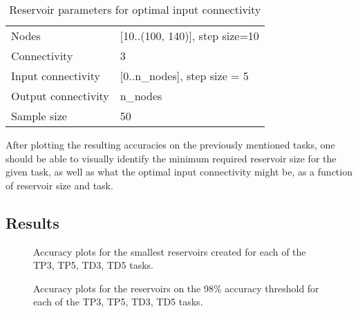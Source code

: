 \begin{table}[ht]
    \centering
    \caption{Reservoir parameters for optimal input connectivity}
    \label{tab:ic-reservoir-parameters}
    \begin{tabular}{ll}
        Nodes               & [10..(100, 140)], step size=10 \\
        Connectivity        & 3                              \\
        Input connectivity  & [0..n\_nodes], step size = 5   \\
		Output connectivity & n\_nodes                       \\
        Sample size         & 50
    \end{tabular}
\end{table}

After plotting the resulting accuracies on the previously mentioned tasks,
one should be able to visually identify the minimum required reservoir size for the given task,
as well as what the optimal input connectivity might be, as a function of reservoir size and task.

\label{experiments:1:results}
\subsection{Results}

\begin{figure}[ht]
    \centering
    \caption{Accuracy plots for the smallest reservoirs created for each of the TP3, TP5, TD3, TD5 tasks.}

    \label{fig:accuracy-min-size}
    \resizebox{\textwidth}{!}{
        \subfloat[TP3, N=10]{
            
        }
        \subfloat[TP5, N=10]{
            
        }
    }
    \resizebox{\textwidth}{!}{
        \subfloat[TD3, N=5]{
            
        }
        \subfloat[TD5, N=10]{
            
        }
    }
\end{figure}

\begin{figure}[ht]
    \centering
    \caption{Accuracy plots for the reservoirs on the 98\% accuracy threshold for each of the TP3, TP5, TD3, TD5 tasks.}

    \label{fig:accuracy-threshold-size}
    \resizebox{\textwidth}{!}{
        \subfloat[TP3, N=20]{
            
        }
        \subfloat[TP5, N=90]{
            
        }
    }
    \resizebox{\textwidth}{!}{
        \subfloat[TD3, N=10]{
            
        }
        \subfloat[TD5, N=55]{
            
        }
    }
\end{figure}

